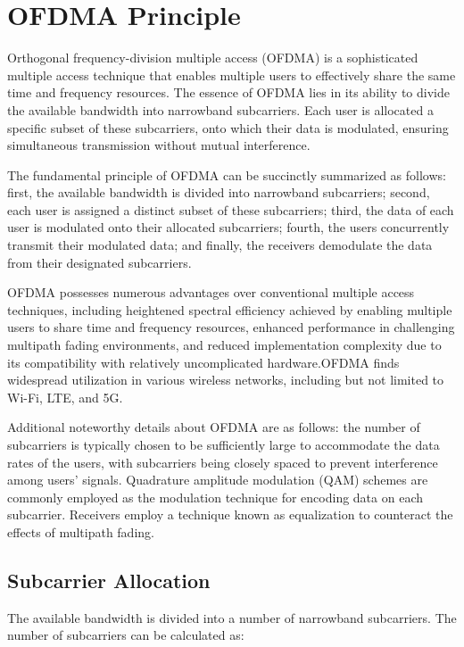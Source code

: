 \documentclass[conference]{IEEEtran}
\begin{document}
\section{OFDMA Principle}
Orthogonal frequency-division multiple access (OFDMA) is a sophisticated multiple access technique that enables multiple users to effectively share the same time and frequency resources. The essence of OFDMA lies in its ability to divide the available bandwidth into narrowband subcarriers. Each user is allocated a specific subset of these subcarriers, onto which their data is modulated, ensuring simultaneous transmission without mutual interference.

The fundamental principle of OFDMA can be succinctly summarized as follows: first, the available bandwidth is divided into narrowband subcarriers; second, each user is assigned a distinct subset of these subcarriers; third, the data of each user is modulated onto their allocated subcarriers; fourth, the users concurrently transmit their modulated data; and finally, the receivers demodulate the data from their designated subcarriers.

OFDMA possesses numerous advantages over conventional multiple access techniques, including heightened spectral efficiency achieved by enabling multiple users to share time and frequency resources, enhanced performance in challenging multipath fading environments, and reduced implementation complexity due to its compatibility with relatively uncomplicated hardware.OFDMA finds widespread utilization in various wireless networks, including but not limited to Wi-Fi, LTE, and 5G.

Additional noteworthy details about OFDMA are as follows: the number of subcarriers is typically chosen to be sufficiently large to accommodate the data rates of the users, with subcarriers being closely spaced to prevent interference among users' signals. Quadrature amplitude modulation (QAM) schemes are commonly employed as the modulation technique for encoding data on each subcarrier. Receivers employ a technique known as equalization to counteract the effects of multipath fading.

\subsection{Subcarrier Allocation}

The available bandwidth is divided into a number of narrowband subcarriers. The number of subcarriers can be calculated as:
\end{document}
